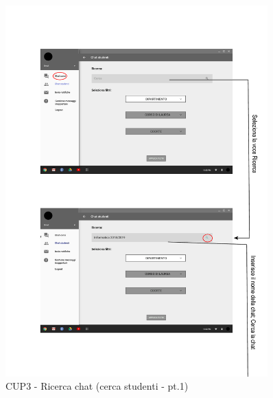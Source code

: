 \begin{figure}
	\centering
	\includegraphics[width=0.9\textwidth]{imgs/gruppo6/activities/act_cup3_ricerca_chat_studenti.pdf}
	\caption{CUP3 - Ricerca chat (cerca studenti - pt.1)}
	\label{fig:cup3-7}
\end{figure}

